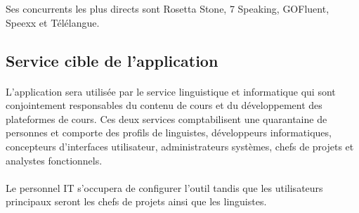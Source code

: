 Ses concurrents les plus directs sont Rosetta Stone, 7 Speaking, GOFluent, Speexx et Télélangue.

\subsection{Service cible de l'application}
\label{ssec:target-service}
\paragraph{}
L'application sera utilisée par le service linguistique et informatique qui sont conjointement responsables du contenu de cours
et du développement des plateformes de cours.
Ces deux services comptabilisent une quarantaine de personnes et comporte des profils de linguistes, développeurs informatiques,
concepteurs d'interfaces utilisateur, administrateurs systèmes, chefs de projets et analystes fonctionnels.

\paragraph{}
Le personnel IT s'occupera de configurer l'outil tandis que les utilisateurs principaux seront les chefs de projets ainsi que les linguistes.
